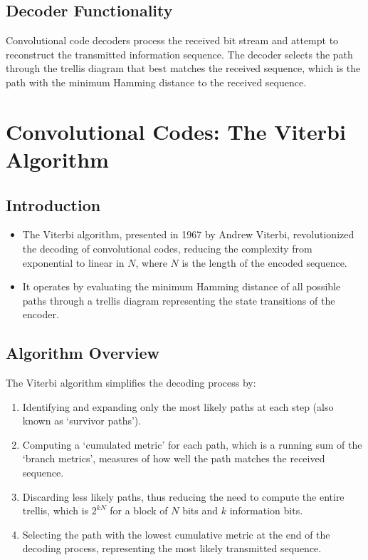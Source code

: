 \subsection*{Decoder Functionality}
Convolutional code decoders process the received bit stream and attempt to reconstruct the transmitted information sequence. The decoder selects the path through the trellis diagram that best matches the received sequence, which is the path with the minimum Hamming distance to the received sequence.
\section*{Convolutional Codes: The Viterbi Algorithm}

\subsection*{Introduction}
\begin{itemize}
  \item The Viterbi algorithm, presented in 1967 by Andrew Viterbi, revolutionized the decoding of convolutional codes, reducing the complexity from exponential to linear in \( N \), where \( N \) is the length of the encoded sequence.
  \item It operates by evaluating the minimum Hamming distance of all possible paths through a trellis diagram representing the state transitions of the encoder.
\end{itemize}

\subsection*{Algorithm Overview}
The Viterbi algorithm simplifies the decoding process by:
\begin{enumerate}
  \item Identifying and expanding only the most likely paths at each step (also known as `survivor paths').
  \item Computing a `cumulated metric' for each path, which is a running sum of the `branch metrics', measures of how well the path matches the received sequence.
  \item Discarding less likely paths, thus reducing the need to compute the entire trellis, which is \( 2^{kN} \) for a block of \( N \) bits and \( k \) information bits.
  \item Selecting the path with the lowest cumulative metric at the end of the decoding process, representing the most likely transmitted sequence.
\end{enumerate}

